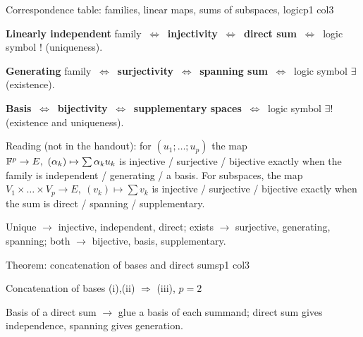 \documentclass[sheet,noautoquant,noautokw]{neyvia-study}
\begin{document}
\begin{concept}[1.28]{Correspondence table: families, linear maps, sums of subspaces, logic}{p1 col3}
\begin{definition}
\noindent \textbf{Linearly independent} family $\ \iff\ $ \textbf{injectivity} $\ \iff\ $ \textbf{direct sum} $\ \iff\ $ logic symbol $!$ (uniqueness).
\par\noindent \textbf{Generating} family $\ \iff\ $ \textbf{surjectivity} $\ \iff\ $ \textbf{spanning sum} $\ \iff\ $ logic symbol $\exists$ (existence).
\par\noindent \textbf{Basis} $\ \iff\ $ \textbf{bijectivity} $\ \iff\ $ \textbf{supplementary spaces} $\ \iff\ $ logic symbol $\exists!$ (existence and uniqueness).
\par\noindent Reading (not in the handout): for $(u_1;\dots;u_p)$ the map $\F^p\to E,\ (\alpha_k)\mapsto\sum\alpha_k u_k$ is injective / surjective / bijective exactly when the family is independent / generating / a basis. For subspaces, the map $V_1\times\dots\times V_p\to E,\ (v_k)\mapsto\sum v_k$ is injective / surjective / bijective exactly when the sum is direct / spanning / supplementary.
\end{definition}
\begin{reflex}
Unique \ensuremath{\rightarrow} injective, independent, direct; exists \ensuremath{\rightarrow} surjective, generating, spanning; both \ensuremath{\rightarrow} bijective, basis, supplementary.
\end{reflex}
\end{concept}
\begin{concept}[1.29]{Theorem: concatenation of bases and direct sums}{p1 col3}
\begin{definition}
\end{definition}
\begin{method}{Concatenation of bases (i),(ii) $\Rightarrow$ (iii), $p=2$}
\end{method}
\begin{reflex}
Basis of a direct sum \ensuremath{\rightarrow} glue a basis of each summand; direct sum gives independence, spanning gives generation.
\end{reflex}
\end{concept}
\end{document}
